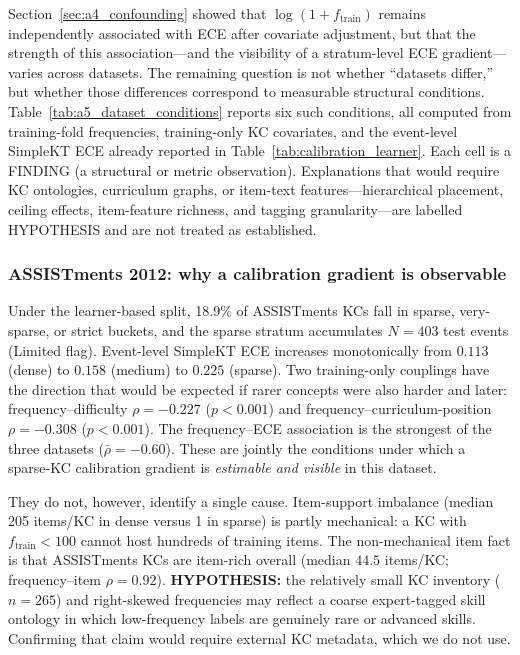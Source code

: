 Section~\ref{sec:a4_confounding} showed that $\log(1+f_{\mathrm{train}})$ remains independently associated with ECE after covariate adjustment, but that the strength of this association---and the visibility of a stratum-level ECE gradient---varies across datasets.
The remaining question is not whether ``datasets differ,'' but whether those differences correspond to measurable structural conditions.
Table~\ref{tab:a5_dataset_conditions} reports six such conditions, all computed from training-fold frequencies, training-only KC covariates, and the event-level SimpleKT ECE already reported in Table~\ref{tab:calibration_learner}.
Each cell is a FINDING (a structural or metric observation).
Explanations that would require KC ontologies, curriculum graphs, or item-text features---hierarchical placement, ceiling effects, item-feature richness, and tagging granularity---are labelled HYPOTHESIS and are not treated as established.

\subsubsection*{ASSISTments 2012: why a calibration gradient is observable}
Under the learner-based split, 18.9\% of ASSISTments KCs fall in sparse, very-sparse, or strict buckets, and the sparse stratum accumulates $N=403$ test events (Limited flag).
Event-level SimpleKT ECE increases monotonically from $0.113$ (dense) to $0.158$ (medium) to $0.225$ (sparse).
Two training-only couplings have the direction that would be expected if rarer concepts were also harder and later: frequency--difficulty $\rho=-0.227$ ($p<0.001$) and frequency--curriculum-position $\rho=-0.308$ ($p<0.001$).
The frequency--ECE association is the strongest of the three datasets ($\bar{\rho}=-0.60$).
These are jointly the conditions under which a sparse-KC calibration gradient is \emph{estimable and visible} in this dataset.

They do not, however, identify a single cause.
Item-support imbalance (median 205 items/KC in dense versus 1 in sparse) is partly mechanical: a KC with $f_{\mathrm{train}}<100$ cannot host hundreds of training items.
The non-mechanical item fact is that ASSISTments KCs are item-rich overall (median $44.5$ items/KC; frequency--item $\rho=0.92$).
\textbf{HYPOTHESIS:} the relatively small KC inventory ($n=265$) and right-skewed frequencies may reflect a coarse expert-tagged skill ontology in which low-frequency labels are genuinely rare or advanced skills.
Confirming that claim would require external KC metadata, which we do not use.

